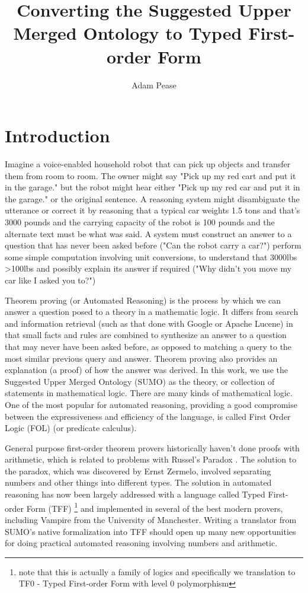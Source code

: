 \documentclass{article}
\title{Converting the Suggested Upper Merged Ontology to Typed First-order Form}
\author[1]{Adam Pease}
\affil[1]{Articulate Software}
\affil[ ]{\textit {apease@articulatesoftware.com}}
\date{\vspace{-5ex}}
\begin{document}
\maketitle

\section{Introduction}

Imagine a voice-enabled household robot that can pick up objects and transfer
them from room to room. The owner might say "Pick up my red cart and put it in
the garage." but the robot might hear either "Pick up my red car and put it in
the garage."  or the original sentence.  A reasoning system might disambiguate
the utterance or correct it by reasoning that a typical car weights 1.5 tons and
that's 3000 pounds and the carrying capacity of the robot is 100 pounds and the
alternate text must be what was said.  A system must construct an answer to a
question that has never been asked before ("Can the robot carry a car?") perform
some simple computation involving unit conversions, to understand that 3000lbs
\textgreater 100lbs and possibly explain its answer if required ("Why didn't you
move my car like I asked you to?")

Theorem
proving
(or Automated Reasoning) is the process by which we can answer a question posed
to a theory in a mathematic logic.  It differs from search and information
retrieval (such as that done with Google or Apache Lucene) in that small facts
and rules are combined to synthesize an answer to a question that may never have
been asked before, as opposed to matching a query to the most similar previous
query and answer.  Theorem proving also provides an explanation (a proof) of how
the answer was derived.  In this work, we use the Suggested Upper Merged
Ontology (SUMO) \citep{np01,p11} as the theory, or collection of statements in
mathematical logic. There are many kinds of mathematical logic.  One of the most
popular for automated reasoning, providing a good compromise between the
expressiveness and efficiency of the language, is called First Order Logic (FOL)
(or predicate calculus).

General purpose first-order theorem provers historically haven't done proofs
with arithmetic, which is related to problems with Russel's
Paradox \citep{BaldwinLessmann}. The solution to the paradox, which was
discovered by Ernst Zermelo, involved separating numbers and other things into
different types. The solution in automated reasoning has now been largely
addressed with a language called Typed First-order Form
(TFF) \citep{SutcliffeTFF}\footnote{note that this is actually a family of logics
and specifically we translation to TF0 - Typed First-order Form with level 0
polymorphism} and implemented in several of the best modern provers,
including Vampire \citep{Kovacs:2013:FTP:2958031.2958033} from the University of
Manchester. Writing a translator from SUMO's native formalization into TFF
should open up many new opportunities for doing practical automated reasoning involving
numbers and arithmetic.
\end{document}
